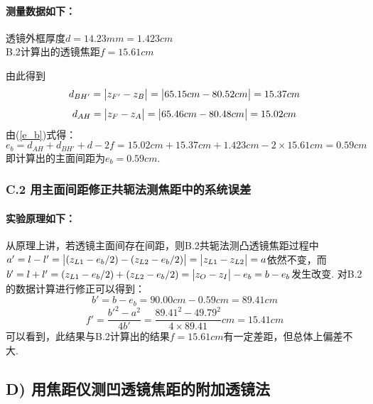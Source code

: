 \documentclass[UTF8]{ctexart}
\begin{document}
\paragraph{测量数据如下：}\quad\par
\begin{center}
透镜外框厚度\quad$d=14.23mm=1.423cm$\\
B.2计算出的透镜焦距\quad$f=15.61cm$
\end{center}
\begin{table}[H]
\begin{center}
    \caption{主面间距测量原始数据表}
\end{center}
\end{table}
由此得到
\[d_{BH'}=\big{|}z_{F'}-z_{B}\big{|}=\big{|}65.15cm-80.52cm\big{|}=15.37cm\]
\[d_{AH}=\big{|}z_{F}-z_{A}\big{|}=\big{|}65.46cm-80.48cm\big{|}=15.02cm\]
由(\ref{e_b})式得：
\[e_b=d_{AH}+d_{BH'}+d-2f=15.02cm+15.37cm+1.423cm-2\times15.61cm=0.59cm\]
即计算出的主面间距为$e_b=0.59cm$.

\subsubsection*{C.2 用主面间距修正共轭法测焦距中的系统误差}
\paragraph{实验原理如下：}\quad\par
从原理上讲，若透镜主面间存在间距，则B.2共轭法测凸透镜焦距过程中$a'=l-l'=\big{|}(z_{L1}-e_b/2)-(z_{L2}-e_b/2)\big{|}=\big{|}z_{L1}-z_{L2}\big{|}=a$依然不变，而$b'=l+l'=(z_{L1}-e_b/2)+(z_{L2}-e_b/2)=\big{|}z_{O}-z_{I}\big{|}-e_b=b-e_b$发生改变. 对B.2的数据计算进行修正可以得到：
\[b'=b-e_b=90.00cm-0.59cm=89.41cm\]
\[f'=\frac{b'^2-a^2}{4b'}=\frac{89.41^2-49.79^2}{4\times89.41}cm=15.41cm\]
可以看到，此结果与B.2计算出的结果$f=15.61cm$有一定差距，但总体上偏差不大.

\subsection*{ D) 用焦距仪测凹透镜焦距的附加透镜法}
\end{document}

